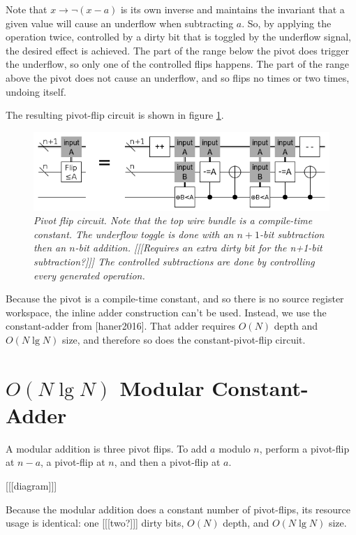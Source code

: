 \documentclass[twocolumn]{article}
\begin{document}
Note that $x \rightarrow \lnot(x - a)$ is its own inverse and maintains the invariant that a given value will cause an underflow when subtracting $a$.
So, by applying the operation twice, controlled by a dirty bit that is toggled by the underflow signal, the desired effect is achieved.
The part of the range below the pivot does trigger the underflow, so only one of the controlled flips happens.
The part of the range above the pivot does not cause an underflow, and so flips no times or two times, undoing itself.

The resulting pivot-flip circuit is shown in figure \ref{fig:const-pivot-flip}.

\begin{figure}
  \centering
  \includegraphics[totalheight=2cm]{pivot-flip.png}
  \caption{\em Pivot flip circuit.
  Note that the top wire bundle is a compile-time constant.
  The underflow toggle is done with an $n+1$-bit subtraction then an $n$-bit addition.
  [[[Requires an extra dirty bit for the n+1-bit subtraction?]]]
  The controlled subtractions are done by controlling every generated operation.}
  \label{fig:const-pivot-flip}
\end{figure}

Because the pivot is a compile-time constant, and so there is no source register workspace, the inline adder construction can't be used.
Instead, we use the constant-adder from [haner2016].
That adder requires $O(N)$ depth and $O(N \lg N)$ size, and therefore so does the constant-pivot-flip circuit.

\section{$O(N \lg N)$ Modular Constant-Adder}

A modular addition is three pivot flips.
To add $a$ modulo $n$, perform a pivot-flip at $n-a$, a pivot-flip at $n$, and then a pivot-flip at $a$.

[[[diagram]]]

Because the modular addition does a constant number of pivot-flips, its resource usage is identical: one [[[two?]]] dirty bits, $O(N)$ depth, and $O(N \lg N)$ size.
\end{document}
